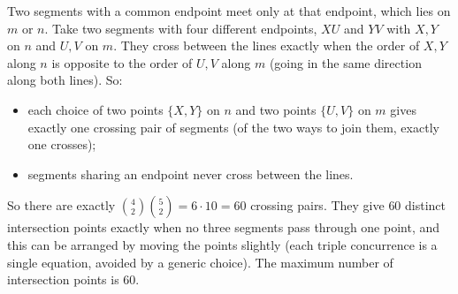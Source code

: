 Two segments with a common endpoint meet only at that endpoint, which lies on $m$ or $n$. Take two segments with four different endpoints, $XU$ and $YV$ with $X,Y$ on $n$ and $U,V$ on $m$. They cross between the lines exactly when the order of $X,Y$ along $n$ is opposite to the order of $U,V$ along $m$ (going in the same direction along both lines). So:
\begin{itemize}
\item each choice of two points $\{X,Y\}$ on $n$ and two points $\{U,V\}$ on $m$ gives exactly one crossing pair of segments (of the two ways to join them, exactly one crosses);
\item segments sharing an endpoint never cross between the lines.
\end{itemize}
So there are exactly $\binom42\binom52=6\cdot10=60$ crossing pairs. They give $60$ distinct intersection points exactly when no three segments pass through one point, and this can be arranged by moving the points slightly (each triple concurrence is a single equation, avoided by a generic choice). The maximum number of intersection points is $\boxed{60}$.
